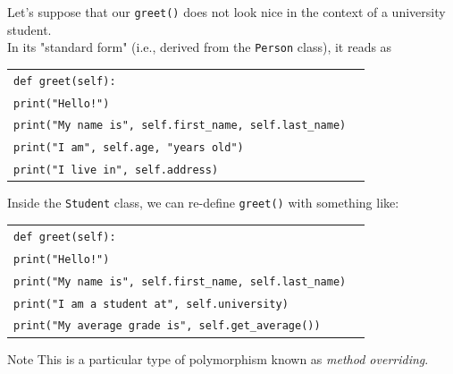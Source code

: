 \documentclass[t,handout,9pt]{beamer}
\begin{document}
\begin{frame}
Let's suppose that our \texttt{greet()} does not look nice in the context of a university student.\\
In its "standard form" (i.e., derived from the \texttt{Person} class), it reads as
\begin{table}[]
\begin{flushleft}
\begin{tabular}{ll}
\texttt{def greet(self):} &  \\
\texttt{\qquad print("Hello!")} &  \\
\texttt{\qquad print("My name is", self.first\_name, self.last\_name)} &  \\
\texttt{\qquad print("I am", self.age, "years old")} &  \\
\texttt{\qquad print("I live in", self.address)} &  \\
\end{tabular}
\end{flushleft}
\end{table}
Inside the \texttt{Student} class, we can re-define \texttt{greet()} with something like:
\begin{table}[]
\begin{flushleft}
\begin{tabular}{ll}
\texttt{def greet(self):} &  \\
\texttt{\qquad print("Hello!")} &  \\
\texttt{\qquad print("My name is", self.first\_name, self.last\_name)} &  \\
\texttt{\qquad print("I am a student at", self.university)} &  \\
\texttt{\qquad print("My average grade is", self.get\_average())} &  \\
\end{tabular}
\end{flushleft}
\end{table}
\begin{block}{Note}
This is a particular type of polymorphism known as \textit{method overriding}.
\end{block}
\end{frame}
%
\end{document}
